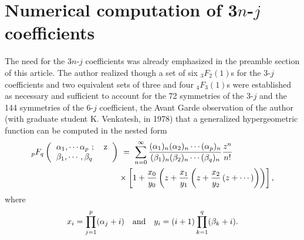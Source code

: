 \section*{Numerical computation of 3$n$-$j$ coefficients}

The need for the 3$n$-$j$ coefficients was already emphasized in the preamble section of this 
article. The author realized though a set of six $_3F_2(1)$s for the 3-$j$ coefficients and two 
equivalent sets of three and four $_4F_3(1)$s were established as necessary and sufficient to 
account for the 72 symmetries of the 3-$j$ and the 144 symmetries of the 6-$j$ coefficient, the 
Avant Garde observation of the author (with graduate student K. Venkatesh, in 1978) that a generalized
hypergeometric function can be computed in the nested form
\begin{equation}
\begin{split}
{}_pF_q
\left( 
\begin{tabular}{lr} 
$\alpha_1,\cdots \alpha_p\ ;$ & z\\
$\beta_1,\cdots, \beta_q $& \\ 
\end{tabular} 
\right) & \ =\ \sum_{n=0}^\infty 
\frac{(\alpha_1)_n (\alpha_2)_n \cdots (\alpha_p)_n}{(\beta_1)_n (\beta_2)_n \cdots (\beta_q)_n}
\frac{z^n}{n!}\\
& \times \left[ 1 + \frac{x_0}{y_0}\left(z + \frac{x_1}{y_1}\left( z + \frac{x_2}{y_2}\left(z + \cdots 
\right) \right) \right) \right], \label{chap29-eq59}
\end{split}
\end{equation}
where
\begin{equation}
x_i=\prod_{j=1}^p (\alpha_j + i)\quad {\rm and}\quad y_i= (i+1)\prod_{k=1}^q (\beta_k + i).\label{chap29-eq60}
\end{equation}

